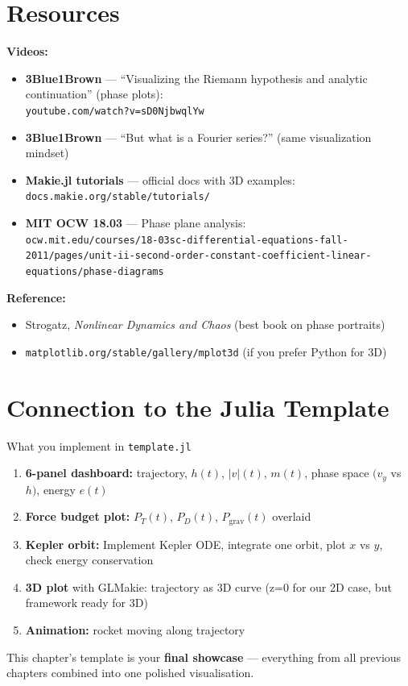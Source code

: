 \documentclass[12pt, a4paper]{article}
\begin{document}
\begin{solutionspace}[9cm]
\end{solutionspace}

\section{Resources}

\begin{hintbox}
\textbf{Videos:}
\begin{itemize}
  \item \textbf{3Blue1Brown} — ``Visualizing the Riemann hypothesis and analytic continuation'' (phase plots):\\
        \texttt{youtube.com/watch?v=sD0NjbwqlYw}
  \item \textbf{3Blue1Brown} — ``But what is a Fourier series?'' (same visualization mindset)
  \item \textbf{Makie.jl tutorials} — official docs with 3D examples:\\
        \texttt{docs.makie.org/stable/tutorials/}
  \item \textbf{MIT OCW 18.03} — Phase plane analysis:\\
        \texttt{ocw.mit.edu/courses/18-03sc-differential-equations-fall-2011/pages/unit-ii-second-order-constant-coefficient-linear-equations/phase-diagrams}
\end{itemize}
\textbf{Reference:}
\begin{itemize}
  \item Strogatz, \textit{Nonlinear Dynamics and Chaos} (best book on phase portraits)
  \item \texttt{matplotlib.org/stable/gallery/mplot3d} (if you prefer Python for 3D)
\end{itemize}
\end{hintbox}

\section{Connection to the Julia Template}

\begin{theorybox}{What you implement in \texttt{template.jl}}
\begin{enumerate}
  \item \textbf{6-panel dashboard:} trajectory, $h(t)$, $|v|(t)$, $m(t)$, phase space $(v_y$ vs $h)$, energy $e(t)$
  \item \textbf{Force budget plot:} $P_T(t)$, $P_D(t)$, $P_\text{grav}(t)$ overlaid
  \item \textbf{Kepler orbit:} Implement Kepler ODE, integrate one orbit, plot $x$ vs $y$, check energy conservation
  \item \textbf{3D plot} with GLMakie: trajectory as 3D curve (z=0 for our 2D case, but framework ready for 3D)
  \item \textbf{Animation:} rocket moving along trajectory
\end{enumerate}
This chapter's template is your \textbf{final showcase} — everything from all previous chapters combined into one polished visualisation.
\end{theorybox}
\end{document}
